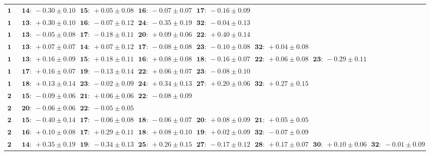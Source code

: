 \begin{sidewaystable}
        \footnotesize
        \begin{tabular}{r|lllllll}
            \hline
\( \mathbf{13} \)& \( \mathbf{14:}~-0.30 \pm 0.10 \)& \( \mathbf{15:}~+0.05 \pm 0.08 \)& \( \mathbf{16:}~-0.07 \pm 0.07 \)& \( \mathbf{17:}~-0.16 \pm 0.09 \)\\ 
\( \mathbf{14} \)& \( \mathbf{13:}~+0.30 \pm 0.10 \)& \( \mathbf{16:}~-0.07 \pm 0.12 \)& \( \mathbf{24:}~-0.35 \pm 0.19 \)& \( \mathbf{32:}~-0.04 \pm 0.13 \)\\ 
\( \mathbf{15} \)& \( \mathbf{13:}~-0.05 \pm 0.08 \)& \( \mathbf{17:}~-0.18 \pm 0.11 \)& \( \mathbf{20:}~+0.09 \pm 0.06 \)& \( \mathbf{22:}~+0.40 \pm 0.14 \)\\ 
\( \mathbf{16} \)& \( \mathbf{13:}~+0.07 \pm 0.07 \)& \( \mathbf{14:}~+0.07 \pm 0.12 \)& \( \mathbf{17:}~-0.08 \pm 0.08 \)& \( \mathbf{23:}~-0.10 \pm 0.08 \)& \( \mathbf{32:}~+0.04 \pm 0.08 \)\\ 
\( \mathbf{17} \)& \( \mathbf{13:}~+0.16 \pm 0.09 \)& \( \mathbf{15:}~+0.18 \pm 0.11 \)& \( \mathbf{16:}~+0.08 \pm 0.08 \)& \( \mathbf{18:}~-0.16 \pm 0.07 \)& \( \mathbf{22:}~+0.06 \pm 0.08 \)& \( \mathbf{23:}~-0.29 \pm 0.11 \)\\ 
\( \mathbf{18} \)& \( \mathbf{17:}~+0.16 \pm 0.07 \)& \( \mathbf{19:}~-0.13 \pm 0.14 \)& \( \mathbf{22:}~+0.06 \pm 0.07 \)& \( \mathbf{23:}~-0.08 \pm 0.10 \)\\ 
\( \mathbf{19} \)& \( \mathbf{18:}~+0.13 \pm 0.14 \)& \( \mathbf{23:}~-0.02 \pm 0.09 \)& \( \mathbf{24:}~+0.34 \pm 0.13 \)& \( \mathbf{27:}~+0.20 \pm 0.06 \)& \( \mathbf{32:}~+0.27 \pm 0.15 \)\\ 
\( \mathbf{20} \)& \( \mathbf{15:}~-0.09 \pm 0.06 \)& \( \mathbf{21:}~+0.06 \pm 0.06 \)& \( \mathbf{22:}~-0.08 \pm 0.09 \)\\ 
\( \mathbf{21} \)& \( \mathbf{20:}~-0.06 \pm 0.06 \)& \( \mathbf{22:}~-0.05 \pm 0.05 \)\\ 
\( \mathbf{22} \)& \( \mathbf{15:}~-0.40 \pm 0.14 \)& \( \mathbf{17:}~-0.06 \pm 0.08 \)& \( \mathbf{18:}~-0.06 \pm 0.07 \)& \( \mathbf{20:}~+0.08 \pm 0.09 \)& \( \mathbf{21:}~+0.05 \pm 0.05 \)\\ 
\( \mathbf{23} \)& \( \mathbf{16:}~+0.10 \pm 0.08 \)& \( \mathbf{17:}~+0.29 \pm 0.11 \)& \( \mathbf{18:}~+0.08 \pm 0.10 \)& \( \mathbf{19:}~+0.02 \pm 0.09 \)& \( \mathbf{32:}~-0.07 \pm 0.09 \)\\ 
\( \mathbf{24} \)& \( \mathbf{14:}~+0.35 \pm 0.19 \)& \( \mathbf{19:}~-0.34 \pm 0.13 \)& \( \mathbf{25:}~+0.26 \pm 0.15 \)& \( \mathbf{27:}~-0.17 \pm 0.12 \)& \( \mathbf{28:}~+0.17 \pm 0.07 \)& \( \mathbf{30:}~+0.10 \pm 0.06 \)& \( \mathbf{32:}~-0.01 \pm 0.09 \)\\ 

\end{tabular}
\end{sidewaystable}
